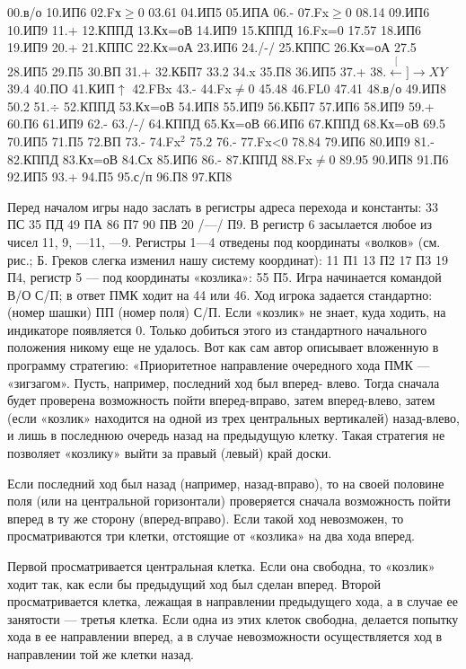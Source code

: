 \documentclass[11pt,a4paper,oneside]{article}
\def\XY{$\stackrel[\leftarrow]{\rightarrow}{XY}$}
\begin{document}
00.в/о 10.ИП6 02.Fх$\geq$0 03.61 04.ИП5 05.ИПА 06.- 07.Fx$\geq$0 08.14 09.ИП6 10.ИП9 11.+ 12.КППД 13.Кх=оВ 14.ИП9 15.КППД 16.Fx=0 17.57 18.ИП6 19.ИП9 20.+ 21.КППС 22.Кх=оА 23.ИП6 24./-/ 25.КППС 26.Кх=оА 27.5 28.ИП5 29.П5 30.ВП 31.+ 32.КБП7 33.2 34.x 35.П8 36.ИП5 37.+ 38.\XY 39.4 40.ПО 41.КИП$\uparrow$ 42.FBx 43.- 44.Fx$\neq$0 45.48 46.FL0 47.41 48.в/о 49.ИП8 50.2 51.$\div$ 52.КППД 53.Кх=оВ 54.ИП8 55.ИП9 56.КБП7 57.ИП6 58.ИП9 59.+ 60.П6 61.ИП9 62.- 63./-/ 64.КППД 65.Кх=оВ 66.ИП6 67.КППД 68.Кх=оВ 69.5 70.ИП5 71.П5 72.ВП 73.- 74.Fx$^{2}$ 75.2 76.- 77.Fx<0 78.84 79.ИП6 80.ИП9 81.- 82.КППД 83.Кх=оВ 84.Сх 85.ИП6 86.- 87.КППД 88.Fx$\neq$0 89.95 90.ИП8 91.П6 92.ИП5 93.+ 94.П5 95.с/п 96.П8 97.КП8

Перед началом игры надо заслать в регистры адреса перехода и константы: 33 ПС 35 ПД 49 ПА 86 П7 90 ПВ 20 /—/ П9. В регистр 6 засылается любое из чисел 11, 9, —11, —9. Регистры 1—4 отведены под координаты «волков» (см. рис.; Б. Греков слегка изменил нашу систему координат): 11 П1 13 П2 17 П3 19 П4, регистр 5 — под координаты «козлика»: 55 П5. Игра начинается командой В/О С/П; в ответ ПМК ходит на 44 или 46. Ход игрока задается стандартно: (номер шашки) ПП (номер поля) С/П. Если «козлик» не знает, куда ходить, на индикаторе появляется 0. Только добиться этого из стандартного начального положения никому еще не удалось. Вот как сам автор описывает вложенную в программу стратегию:
«Приоритетное направление очередного хода ПМК — «зигзагом». Пусть, например, последний ход был вперед- влево. Тогда сначала будет проверена возможность пойти вперед-вправо, затем вперед-влево, затем (если «козлик» находится на одной из трех центральных вертикалей) назад-влево, и лишь в последнюю очередь назад на предыдущую клетку. Такая стратегия не позволяет «козлику» выйти за правый (левый) край доски.

Если последний ход был назад (например, назад-вправо), то на своей половине поля (или на центральной горизонтали) проверяется сначала возможность пойти вперед в ту же сторону (вперед-вправо). Если такой ход невозможен, то просматриваются три клетки, отстоящие от «козлика» на два хода вперед.

Первой просматривается центральная клетка. Если она свободна, то «козлик» ходит так, как если бы предыдущий ход был сделан вперед. Второй просматривается клетка, лежащая в направлении предыдущего хода, а в случае ее занятости — третья клетка. Если одна из этих клеток свободна, делается попытку хода в ее направлении вперед, а в случае невозможности осуществляется ход в направлении той же клетки назад.
\end{document}
